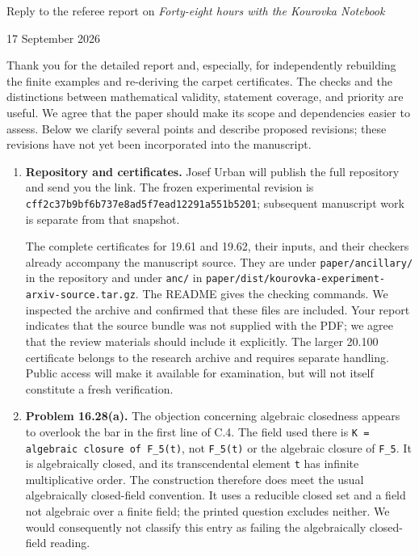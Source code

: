 Reply to the referee report on \emph{Forty-eight hours with the Kourovka
Notebook}

17 September 2026

Thank you for the detailed report and, especially, for independently
rebuilding the finite examples and re-deriving the carpet certificates.
The checks and the distinctions between mathematical validity, statement
coverage, and priority are useful. We agree that the paper should make
its scope and dependencies easier to assess. Below we clarify several
points and describe proposed revisions; these revisions have not yet
been incorporated into the manuscript.

\begin{enumerate}
\def\labelenumi{\arabic{enumi}.}
\item
  \textbf{Repository and certificates.} Josef Urban will publish the
  full repository and send you the link. The frozen experimental
  revision is \nolinkurl{cff2c37b9bf6b737e8ad5f7ead12291a551b5201};
  subsequent manuscript work is separate from that snapshot.

  The complete certificates for 19.61 and 19.62, their inputs, and their
  checkers already accompany the manuscript source. They are under
  \nolinkurl{paper/ancillary/} in the repository and under
  \nolinkurl{anc/} in
  \nolinkurl{paper/dist/kourovka-experiment-arxiv-source.tar.gz}. The
  README gives the checking commands. We inspected the archive and
  confirmed that these files are included. Your report indicates that
  the source bundle was not supplied with the PDF; we agree that the
  review materials should include it explicitly. The larger 20.100
  certificate belongs to the research archive and requires separate
  handling. Public access will make it available for examination, but
  will not itself constitute a fresh verification.
\item
  \textbf{Problem 16.28(a).} The objection concerning algebraic
  closedness appears to overlook the bar in the first line of C.4. The
  field used there is \nolinkurl{K = algebraic closure of F_5(t)}, not
  \nolinkurl{F_5(t)} or the algebraic closure of \nolinkurl{F_5}. It is
  algebraically closed, and its transcendental element \nolinkurl{t} has
  infinite multiplicative order. The construction therefore does meet
  the usual algebraically closed-field convention. It uses a reducible
  closed set and a field not algebraic over a finite field; the printed
  question excludes neither. We would consequently not classify this
  entry as failing the algebraically closed-field reading.


\end{enumerate}
